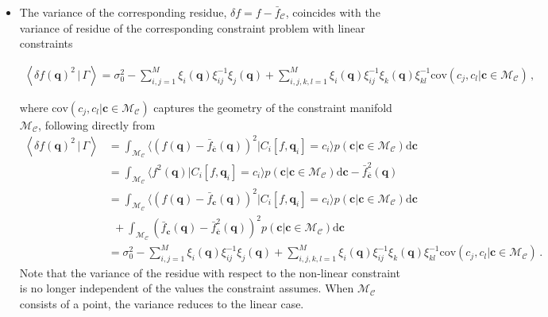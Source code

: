 \documentclass[a4paper, 11pt]{article}
\begin{document}
\begin{itemize}
\item
The variance of the corresponding residue, $\delta f = f - \bar{f}_{\mathcal{C}}$, coincides with the variance of residue of the corresponding constraint problem with linear constraints
\begin{framed}
\begin{align}
\left \langle \delta f (\bm{q})^2\,|\,\Gamma\right\rangle =
\sigma_0^2 - \sum_{i,j=1}^M\xi_i(\bm{q}) \xi_{ij}^{-1} \xi_j(\bm{q}) + \sum_{i,j,k,l=1}^M \xi_{i}(\bm{q})\xi_{ij}^{-1}\xi_{k}(\bm{q})\xi_{kl}^{-1}\text{cov}(c_j, c_l|\bm{c}\in\mathcal{M}_\mathcal{C})
\,,
\end{align}
\end{framed}
where $\text{cov}(c_j, c_l|\bm{c}\in\mathcal{M}_\mathcal{C})$ captures the geometry of the constraint manifold $\mathcal{M}_\mathcal{C}$, following directly from
\begin{align}
\left \langle \delta f (\bm{q})^2\,|\,\Gamma\right\rangle 
&= \int_{\mathcal{M}_\mathcal{C}} \langle (f(\bm{q})-\bar{f}_{\bar{\bm{c}}}(\bm{q}))^2|C_i[f,\bm{q}_i]=c_i\rangle p(\bm{c}|\bm{c}\in\mathcal{M}_{\mathcal{C}})\mathrm{d}\bm{c}\\
&= \int_{\mathcal{M}_\mathcal{C}} \langle f^2(\bm{q})|C_i[f,\bm{q}_i]=c_i\rangle p(\bm{c}|\bm{c}\in\mathcal{M}_{\mathcal{C}})\mathrm{d}\bm{c} - \bar{f}_{\bar{\bm{c}}}^2(\bm{q})\\
&= \int_{\mathcal{M}_\mathcal{C}} \langle (f(\bm{q})-\bar{f}_{\bm{c}}(\bm{q}))^2|C_i[f,\bm{q}_i]=c_i\rangle p(\bm{c}|\bm{c}\in\mathcal{M}_{\mathcal{C}})\mathrm{d}\bm{c} \\
&\ \ +\int_{\mathcal{M}_\mathcal{C}} (\bar{f}_{\bm{c}}(\bm{q})- \bar{f}_{\bar{\bm{c}}}^2(\bm{q}))^2p(\bm{c}|\bm{c}\in\mathcal{M}_{\mathcal{C}})\mathrm{d}\bm{c} \\
&=  \sigma_0^2 - \sum_{i,j=1}^M\xi_i(\bm{q}) \xi_{ij}^{-1} \xi_j(\bm{q}) + \sum_{i,j,k,l=1}^M \xi_{i}(\bm{q})\xi_{ij}^{-1}\xi_{k}(\bm{q})\xi_{kl}^{-1}\text{cov}(c_j, c_l|\bm{c}\in\mathcal{M}_\mathcal{C})\,.
\end{align}
Note that the variance of the residue with respect to the non-linear constraint is no longer independent of the values the constraint assumes. When $\mathcal{M}_\mathcal{C}$ consists of a point, the variance reduces to the linear case.
\end{itemize}



\end{document}
